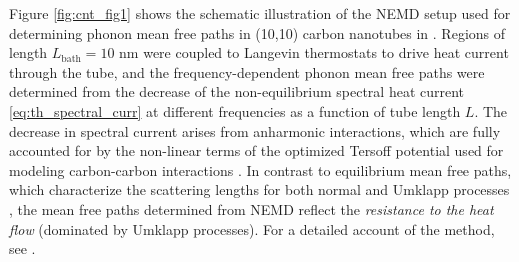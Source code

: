 Figure \ref{fig:cnt_fig1} shows the schematic illustration of the NEMD setup used for determining phonon mean free paths in (10,10) carbon nanotubes in . Regions of length $L_{\textrm{bath}}=10$ nm were coupled to Langevin thermostats to drive heat current through the tube, and the frequency-dependent phonon mean free paths were determined from the decrease of the non-equilibrium spectral heat current \eqref{eq:th_spectral_curr} at different frequencies as a function of tube length $L$. The decrease in spectral current arises from anharmonic interactions, which are fully accounted for by the non-linear terms of the optimized Tersoff potential used for modeling carbon-carbon interactions \cite{tersoff88a,lindsay10}. In contrast to equilibrium mean free paths, which characterize the scattering lengths for both normal and Umklapp processes \cite{mcgaughey04}, the mean free paths determined from NEMD reflect the \textit{resistance to the heat flow} (dominated by Umklapp processes). For a detailed account of the method, see .


